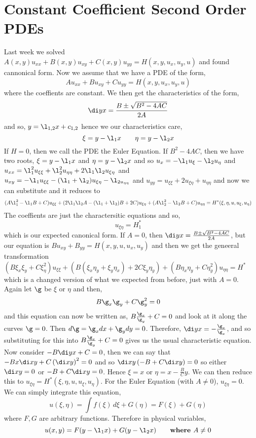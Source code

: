 
\section{Constant Coefficient Second Order PDEs}

Last week we solved $A(x, y)u_{xx} + B(x, y)u_{xy} + C(x,y)u_{yy} = H(x, y, u_x, u_y, u)$ and found cannonical form. Now we assume that we have a PDE of the form,
$$ Au_{xx} + Bu_{xy} + Cu_{yy} = H(x, y, u_x, u_y, u) $$
where the coeffients are constant. We then get the characteristics of the form,
$$ \di y x = \frac{B \pm \sqrt{B^2 - 4AC}}{2A} $$
and so,
$y = \l_{1, 2}x + c_{1, 2}$
hence we our characteristics care,
$$ \xi = y - \l_1x \qquad \eta = y - \l_2x $$
If $H = 0$, then we call the PDE the Euler Equation. If $B^2 - 4AC$, then we have two roots, $\xi = y - \l_1x$ and $\eta = y - \l_2x$ and so $u_{x} = -\l_1u_\xi - \l_2u_\eta$ and $u_{xx} = \l_1^2u_{\xi\xi} + \l_2^2u_{\eta\eta} + 2\l_1\l_2u_{\xi\eta}$ and $u_{xy} = -\l_1u_{\xi\xi} - (\l_1 + \l_2)u_{\xi\eta} - \l_{2u_{\eta\eta}}$ and $u_{yy} = u_{\xi\xi} + 2u_{\xi\eta} + u_{\eta\eta}$ and now we can substitute and it reduces to
$$ (A\l_1^2 - \l_1B + C)u_{\xi\xi} + (2\l_1\l_2 A - (\l_1 + \l_2)B + 2C)u_{\xi\eta} + (A\l_2^2 - \l_2B + C)u_{\eta\eta} = H^*(\xi,\eta, u, u_\xi, u_\eta) $$
The coeffients are just the charactersitic equations and so,
$$ u_{\xi\eta} = H^*_1 $$
which is our expected canonical form. If $A = 0$, then $\di y x = \frac{B \pm \sqrt{B^2 - 4AC}}{2A}$, but our equation is $Bu_{xy} + B_{yy} = H(x, y, u, u_x, u_y)$ and then we get the geneeral transformation $(B\xi_x\xi_y + C\xi_\eta^2)u_{\xi\xi} + (B(\xi_x\eta_y + \xi_y\eta_x) + 2C\xi_y\eta_y) + (B\eta_x\eta_y + C\eta_y^2)u_{\eta\eta} = H^*$
which is a changed version of what we expected from before, just with $A = 0$. Again let $\g$ be $\xi$ or $\eta$ and then,
$$ B\g_x\g_y + C\g_y^2 = 0 $$
and this equation can now be written as, $B \frac{\g_x}{\g_y} + C = 0$ and look at it along the curves $\g =0$. Then $d\g = \g_xdx + \g_ydy = 0$. Therefore, $\di y x = -\frac{\g_x}{\g_x}$, and so substituting for this into $B\frac{\g_x}{\g_y} + C = 0$ gives us the usual characteristic equation.\\

\noindent
Now consider $-B\di y x + C = 0$, then we can say that $-Bx\di x y + C\left(\di x y\right)^2 = 0$ and so $\di x y\left( -B + C\di x y \right) = 0$ so either $\di x y = 0$ or $-B + C\di x y = 0$. Hence $\xi = x$ or $\eta = x - \frac{B}{C}y$. We can then reduce this to $u_{\xi\eta} = H^*(\xi, \eta, u, u_\xi, u_\eta)$. For the Euler Equation (with $A \ne 0$), $u_{\xi\eta} = 0$.
We can simply integrate this equation,
$$ u(\xi, \eta) = \int f(\xi)\,d\xi + G(\eta) = F(\xi) + G(\eta)$$
where $F, G$ are arbitrary functions. Therefore in physical variables,
$$ u(x, y) = F(y - \l_1x) + G(y - \l_2x) \qquad \text{\textbf{where $A \ne 0$}}$$

